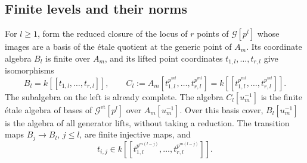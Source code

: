 \subsection{Finite levels and their norms}

\begin{lemma}\label{h3:geom:regular-levels}
For $l\geq1$, form the reduced closure of the locus of $r$ points of
$\mathcal G[p^l]$ whose images are a basis of the \'etale quotient at
the generic point of $A_m$.  Its coordinate algebra $B_l$ is finite
over $A_m$, and its lifted point coordinates $t_{1,l},\ldots,t_{r,l}$
give isomorphisms
\[
 B_l=k[[t_{1,l},\ldots,t_{r,l}]],\qquad
 C_l:=A_m[t_{1,l}^{p^{ml}},\ldots,t_{r,l}^{p^{ml}}]
     =k[[t_{1,l}^{p^{ml}},\ldots,t_{r,l}^{p^{ml}}]].
\]
The subalgebra on the left is already complete.  The algebra
$C_l[u_m^{-1}]$ is the finite \'etale algebra of bases of
$\mathcal G^{\mathrm{et}}[p^l]$ over $A_m[u_m^{-1}]$.
Over this basis cover, $B_l[u_m^{-1}]$ is the algebra of all
generator lifts, without taking a reduction.
The transition maps $B_j\to B_l$, $j\leq l$, are finite injective maps,
and
\[
 t_{i,j}\in
 k[[t_{1,l}^{p^{m(l-j)}},\ldots,t_{r,l}^{p^{m(l-j)}}]].
\]
\end{lemma}

